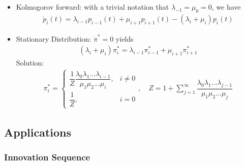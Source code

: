 \begin{itemize}[topsep=2pt,itemsep=0pt]
    \item Kolmogorov forward: with a trivial notation that $ \lambda _{-1}=\mu _0=0 $, we have
    \begin{align}
         \dot{p}_i(t)=\lambda _{i-1}p_{i-1}(t)+\mu _{i+1}p_{i+1}(t)-(\lambda _i+\mu _i)p_i(t)
    \end{align}
    \item Stationary Distribution: $ \dot{\pi}^*=0 $ yields 
    \begin{align}
        (\lambda _i+\mu _i)\pi_i^*=\lambda _{i-1}\pi_{i-1}^*+\mu _{i+1}\pi^*_{i+1} 
    \end{align}
    Solution:
    \begin{align}
        \pi^*_i=\begin{cases}
            \dfrac{1}{Z}\dfrac{\lambda _0\lambda _1\ldots\lambda _{i-1}}{\mu _1\mu _2\ldots\mu _i},&i\neq 0\\
            \dfrac{1}{Z},&i=0
        \end{cases},\quad Z=1+\sum_{j=1}^\infty \dfrac{\lambda _0\lambda _1\ldots\lambda _{j-1}}{\mu _1\mu _2\ldots\mu _j}
    \end{align}
    
\end{itemize}








































\subsection{Applications}


\subsubsection{Innovation Sequence}
     
